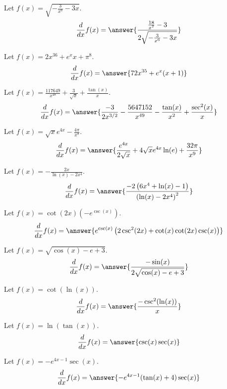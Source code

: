 \documentclass{ximera}
\begin{document}
\begin{shuffle}
\begin{exercise}
\begin{exercise}
Let $f(x)=\sqrt{-\frac{3}{x^6}-3 x}$.
\[
\ddx f(x) = \answer{\frac{\frac{18}{x^7}-3}{2 \sqrt{-\frac{3}{x^6}-3 x}}}
\]
\end{exercise}

\begin{exercise}
Let $f(x)=2 x^{36}+e^x x+\pi ^8$.
\[
\ddx f(x) = \answer{72 x^{35}+e^x (x+1)}
\]
\end{exercise}

\begin{exercise}
Let $f(x)=\frac{117649}{x^{48}}+\frac{3}{\sqrt{x}}+\frac{\tan (x)}{x}$.
\[
\ddx f(x) = \answer{\frac{-3}{2 x^{3/2}}-\frac{5647152}{x^{49}}-\frac{\tan (x)}{x^2}+\frac{\sec ^2(x)}{x}}
\]
\end{exercise}

\begin{exercise}
Let $f(x)=\sqrt{x} e^{4 x}-\frac{4 \pi }{x^8}$.
\[
\ddx f(x) = \answer{\frac{e^{4 x}}{2 \sqrt{x}}+4 \sqrt{x} e^{4 x} \ln (e)+\frac{32 \pi }{x^9}}
\]
\end{exercise}

\begin{exercise}
Let $f(x)=-\frac{2 x}{\ln (x)-2 x^4}$.
\[
\ddx f(x) = \answer{\frac{-2 \left(6 x^4+\ln (x)-1\right)}{\left(\ln (x)-2 x^4\right)^2}}
\]
\end{exercise}

\begin{exercise}
Let $f(x)=\cot (2 x) \left(-e^{\csc (x)}\right)$.
\[
\ddx f(x) = \answer{e^{\csc (x)} \left(2 \csc ^2(2 x)+\cot (x) \cot (2 x) \csc (x)\right)}
\]
\end{exercise}

\begin{exercise}
Let $f(x)=\sqrt{\cos (x)-e+3}$.
\[
\ddx f(x) = \answer{\frac{-\sin (x)}{2 \sqrt{\cos (x)-e+3}}}
\]
\end{exercise}

\begin{exercise}
Let $f(x)=\cot (\ln (x))$.
\[
\ddx f(x) = \answer{\frac{-\csc ^2(\ln (x))}{x}}
\]
\end{exercise}

\begin{exercise}
Let $f(x)=\ln (\tan (x))$.
\[
\ddx f(x) = \answer{\csc (x) \sec (x)}
\]
\end{exercise}

\begin{exercise}
Let $f(x)=-e^{4 x-1} \sec (x)$.
\[
\ddx f(x) = \answer{-e^{4 x-1} (\tan (x)+4) \sec (x)}
\]
\end{exercise}


\end{exercise}
\end{shuffle}
\end{document}
